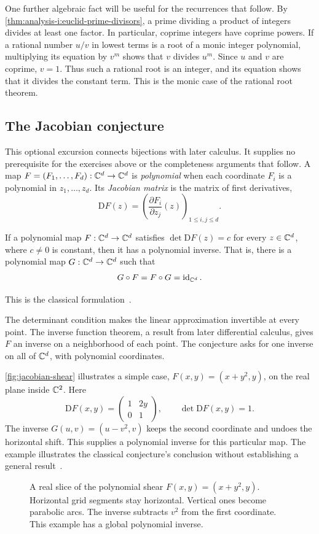 One further algebraic fact will be useful for the recurrences that follow.
By \autoref{thm:analysis-i:euclid-prime-divisors},
a prime dividing a product of integers divides
at least one factor. In particular, coprime integers have coprime powers.
If a rational number $u/v$ in lowest terms is a root of a monic integer
polynomial, multiplying its equation by $v^m$ shows that $v$ divides $u^m$.
Since $u$ and $v$ are coprime, $v=1$. Thus such a rational root is an
integer, and its equation shows that it divides the constant term.
This is the monic case of the rational root theorem.

\subsection{The Jacobian conjecture}
\label{sec:analysis-i:jacobian-conjecture}
This optional excursion connects bijections with later calculus.
It supplies no prerequisite for the exercises above or the completeness
arguments that follow. A map
$F=(F_1,\ldots,F_d):\mathbb{C}^d\to\mathbb{C}^d$ is \emph{polynomial} when each
coordinate $F_i$ is a polynomial in $z_1,\ldots,z_d$. Its
\emph{Jacobian matrix} is the matrix of first derivatives,
\[
  \mathrm DF(z)=
  \left(\frac{\partial F_i}{\partial z_j}(z)\right)_{1\leq i,j\leq d}.
\]

\begin{conjecture}[Jacobian]
  If a polynomial map $F:\mathbb{C}^d\to\mathbb{C}^d$ satisfies
  $\det\mathrm DF(z)=c$ for every $z\in\mathbb{C}^d$, where $c\ne0$ is
  constant, then it has a polynomial inverse. That is, there is a
  polynomial map $G:\mathbb{C}^d\to\mathbb{C}^d$ such that
  \[
    G\circ F=F\circ G=\operatorname{id}_{\mathbb{C}^d}.
  \]
\end{conjecture}
This is the classical formulation~\cite{deGoursac2016}.

The determinant condition makes the linear approximation invertible at
every point. The inverse function theorem, a result from later differential
calculus, gives $F$ an inverse on a neighborhood of each point.
The conjecture asks for one inverse on all of $\mathbb{C}^d$, with polynomial
coordinates.

\autoref{fig:jacobian-shear} illustrates a simple case,
$F(x,y)=(x+y^2,y)$, on the real plane inside $\mathbb{C}^2$. Here
\[
  \mathrm DF(x,y)=\begin{pmatrix}1&2y\\0&1\end{pmatrix},
  \qquad \det\mathrm DF(x,y)=1.
\]
The inverse $G(u,v)=(u-v^2,v)$ keeps the second coordinate and undoes
the horizontal shift. This supplies a polynomial inverse
for this particular map. The example illustrates the classical conjecture's
conclusion without establishing a general result~\cite{deGoursac2016}.
\begin{figure}[htbp]
  \centering
  
  \caption[A polynomial shear and its inverse.]{A real slice of the
    polynomial shear $F(x,y)=(x+y^2,y)$. Horizontal grid segments stay
    horizontal. Vertical ones become parabolic arcs. The inverse
    subtracts $v^2$ from the first coordinate. This example has a
    global polynomial inverse.}
  \label{fig:jacobian-shear}
\end{figure}

